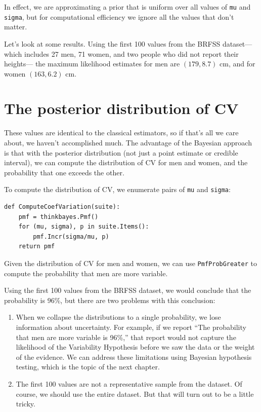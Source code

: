 \documentclass[12pt]{book}
\begin{document}
In effect, we are approximating a prior that is uniform over all values 
of {\tt mu} and {\tt sigma}, but for computational efficiency
we ignore all the values that don't matter.

Let's look at some results.  Using the first 100 values from the BRFSS
dataset---which includes 27 men, 71 women, and two people who did not
report their heights--- the maximum likelihood estimates for men are
$(179, 8.7)$ cm, and for women $(163, 6.2)$ cm.


\section{The posterior distribution of CV}

These values are identical to the classical estimators, so if that's
all we care about, we haven't accomplished much.  The advantage of the
Bayesian approach is that with the posterior distribution (not just a
point estimate or credible interval), we can compute the
distribution of CV for men and women, and the probability that one
exceeds the other.

To compute the distribution of CV, we enumerate pairs of
{\tt mu} and {\tt sigma}:

\begin{verbatim}
def ComputeCoefVariation(suite):
    pmf = thinkbayes.Pmf()
    for (mu, sigma), p in suite.Items():
        pmf.Incr(sigma/mu, p)
    return pmf
\end{verbatim}

Given the distribution of
CV for men and women, we can use \verb"PmfProbGreater" to
compute the probability that
men are more variable.

Using the first 100 values from the BRFSS dataset, we would conclude
that the probability is 96\%, but there are two problems with
this conclusion:

\begin{enumerate}

\item When we collapse the distributions to a single probability, we
  lose information about uncertainty.  For example, if we report ``The
  probability that men are more variable is 96\%,'' that report would
  not capture the likelihood of the Variability Hypothesis before we
  saw the data or the weight of the evidence.  We can address these
  limitations using Bayesian hypothesis testing, which is the topic of
  the next chapter.

\item The first 100 values are not a representative sample from the
  dataset.  Of course, we should use the entire dataset.  But that
  will turn out to be a little tricky.

\end{enumerate}
\end{document}
